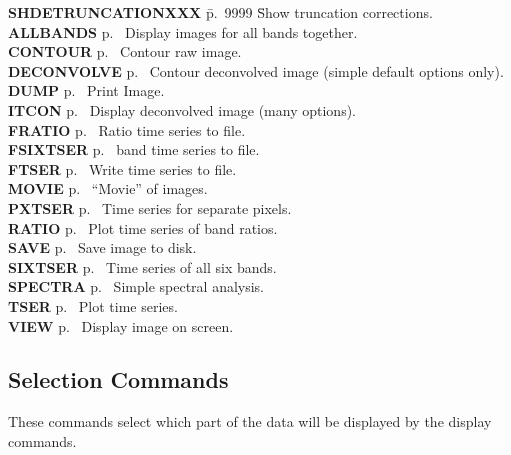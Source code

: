 \begin{tabbing}
{\bf SHDETRUNCATIONXXX} \= p.~9999 \= Show truncation corrections.\kill
{\bf ALLBANDS} \> p.~\pageref{al} \> Display images for all bands
together.\\ 
{\bf CONTOUR} \> p.~\pageref{con} \> Contour raw image.\\
{\bf DECONVOLVE} \> p.~\pageref{dec} \> Contour deconvolved image
(simple default options only).\\ 
{\bf DUMP} \> p.~\pageref{du} \> Print Image.\\ 
{\bf ITCON} \> p.~\pageref{it} \> Display deconvolved image (many options).\\ 
{\bf FRATIO} \> p.~\pageref{fr} \> Ratio time series to file.\\ 
{\bf FSIXTSER} \> p.~\pageref{fsi}  band time series to file.\\ 
{\bf FTSER} \> p.~\pageref{ft} \> Write time series to file.\\
{\bf MOVIE} \> p.~\pageref{mo} \> ``Movie'' of images.\\ 
{\bf PXTSER} \> p.~\pageref{px} \> Time series for separate pixels.\\ 
{\bf RATIO} \> p.~\pageref{ra} \> Plot time series of band ratios.\\ 
{\bf SAVE} \> p.~\pageref{sa} \> Save image to disk.\\ 
{\bf SIXTSER} \> p.~\pageref{six} \> Time series of all six bands.\\ 
{\bf SPECTRA} \> p.~\pageref{sp} \> Simple spectral analysis.\\ 
{\bf TSER} \> p.~\pageref{ts} \> Plot time series.\\ 
{\bf VIEW} \> p.~\pageref{vi} \> Display image on screen.\\
\end{tabbing}

\subsection{Selection Commands}
	 
These commands select which part of the data will be displayed by the
display commands.

